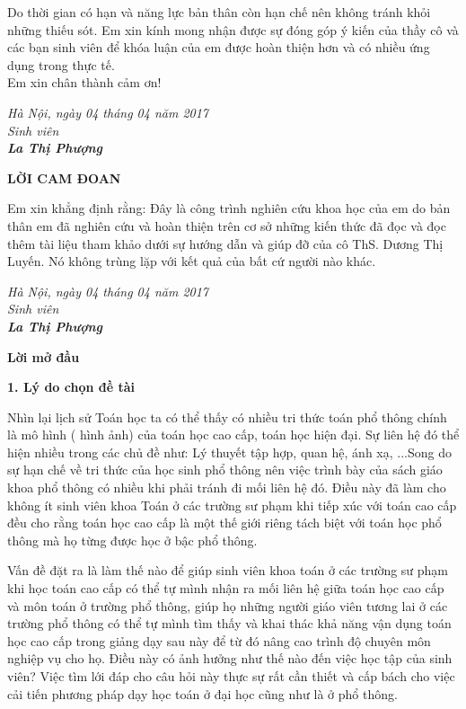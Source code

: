 \documentclass[12pt,oneside,a4paper,reqno]{book}
\begin{document}
\medskip
Do thời gian có hạn và năng lực bản thân còn hạn chế nên không tránh khỏi những thiếu sót. Em xin kính mong nhận được sự đóng góp ý kiến của thầy cô và các bạn sinh viên để khóa luận của em được hoàn thiện hơn và có nhiều ứng dụng trong thực tế.\\
Em xin chân thành cảm ơn!
\begin{flushright}
\it{Hà Nội, ngày 04 tháng 04 năm 2017}\\
  \hspace{2cm} Sinh viên\\
\textbf{La Thị Phượng}
\end{flushright}
\newpage
\vspace*{0.2cm}
\centerline{\Large\bf LỜI CAM ĐOAN}
\medskip
Em xin khẳng định rằng: Đây là công trình nghiên cứu khoa học của em do bản thân em đã nghiên cứu và hoàn thiện trên cơ sở những kiến thức đã đọc và đọc thêm tài liệu tham khảo dưới sự hướng dẫn và giúp đỡ của cô ThS. Dương Thị Luyến. Nó không trùng lặp với kết quả của bất cứ người nào khác.

\begin{flushright}
\it{Hà Nội, ngày 04 tháng 04 năm 2017}\\
  \hspace*{2cm} Sinh viên\\
\textbf{La Thị Phượng}
\end{flushright}
\newpage
\vspace*{0.2cm}
\centerline{\Large\bf Lời mở đầu}
\vspace*{0.5cm}
\textbf{1. Lý do chọn đề tài}


Nhìn lại lịch sử Toán học ta có thể thấy có nhiều tri thức toán phổ thông chính là mô hình ( hình ảnh) của toán học cao cấp, toán học hiện đại. Sự liên hệ đó thể hiện nhiều trong các chủ đề như: Lý thuyết tập hợp, quan hệ, ánh xạ, ...Song do sự hạn chế về tri thức của học sinh phổ thông nên việc trình bày của sách giáo khoa phổ thông có nhiều khi phải tránh đi mối liên hệ đó. Điều này đã làm cho không ít sinh viên khoa Toán ở các trường sư phạm khi tiếp xúc với toán cao cấp đều cho rằng toán học cao cấp là một thế giới riêng tách biệt với toán học phổ thông mà họ từng được học ở bậc phổ thông.

Vấn đề đặt ra là làm thế nào để giúp sinh viên khoa toán ở các trường sư phạm khi học toán cao cấp có thể tự mình nhận ra mối liên hệ giữa toán học cao cấp và môn toán ở trường phổ thông, giúp họ những người giáo viên tương lai ở các trường phổ thông có thể tự mình tìm thấy và khai thác khả năng vận dụng toán học cao cấp trong giảng dạy sau này để từ đó nâng cao trình độ chuyên môn nghiệp vụ cho họ. Điều này có ảnh hưởng như thế nào đến việc học tập của sinh viên? Việc tìm lới đáp cho câu hỏi này thực sự rất cần thiết và cấp bách cho việc cải tiến phương pháp dạy học toán ở đại học cũng như là ở phổ thông.
\end{document}
